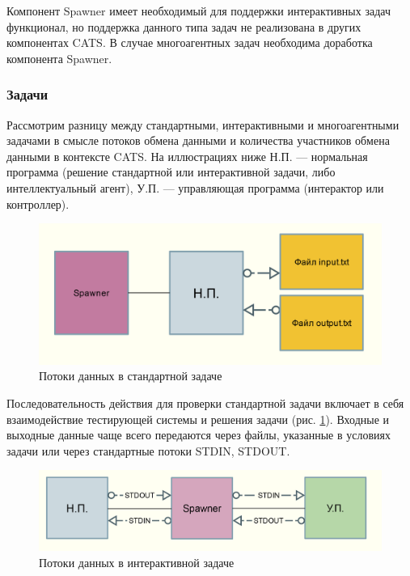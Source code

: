 \documentclass{imcs}
\begin{document}
Компонент Spawner имеет необходимый для поддержки интерактивных задач функционал, но поддержка данного типа задач не реализована в других компонентах CATS. В случае многоагентных задач необходима доработка компонента Spawner.

\subsubsection{Задачи}
Рассмотрим разницу между стандартными, интерактивными и многоагентными задачами в смысле потоков обмена данными и количества участников обмена данными в контексте CATS. На иллюстрациях ниже Н.П. — нормальная программа (решение стандартной или интерактивной задачи, либо интеллектуальный агент), У.П. — управляющая программа (интерактор или контроллер).

\begin{figure}[htb]
\centering
\includegraphics[width=\textwidth,keepaspectratio]{./img/normal_data_flow.png}
\caption{Потоки данных в стандартной задаче}
\label{normal_problem_flow}
\end{figure}

\FloatBarrier

Последовательность действия для проверки стандартной задачи включает в себя взаимодействие тестирующей системы и решения задачи (рис. \ref{normal_problem_flow}). Входные и выходные данные чаще всего передаются через файлы, указанные в условиях задачи или через стандартные потоки STDIN, STDOUT.

\FloatBarrier

\begin{figure}[htb]
\centering
\includegraphics[width=\textwidth,keepaspectratio]{./img/interactive_data_flow.png}
\caption{Потоки данных в интерактивной задаче}
\label{interactive_problem_flow}
\end{figure}
\end{document}
